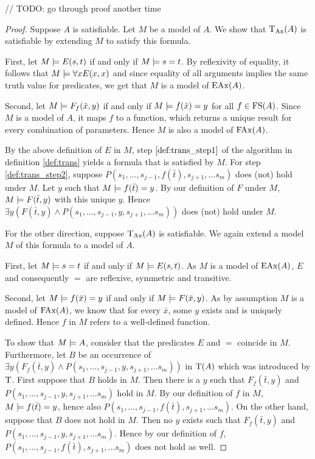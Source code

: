 // TODO: go through proof another time
\begin{proof}
	Suppose $A$ is satisfiable.
	Let $M$ be a model of $A$.
	We show that $\mathrm{T}_{\mathrm{Ax}}(A)$ is satisfiable by extending $M$ to satisfy this formula.

	First, let $M \models E(s, t)$ if and only if $M \models s = t$.
	By reflexivity of equality, it follows that $M \models \forall x E(x, x)$ and since equality of all arguments implies the same truth value for predicates, we get that $M$ is a model of $\mathrm{EAx}(A)$.

	Second, let $M \models F_f(\bar x, y)$ if and only if $M \models f(\bar x) = y$ for all $f \in \mathrm{FS}(A)$. 
	Since $M$ is a model of $A$, it maps $f$ to a function, which returns a unique result for every combination of parameters.
	Hence $M$ is also a model of $\mathrm{FAx}(A)$.

	By the above definition of $E$ in $M$, step $\ref{def:trans_step1}$ of the algorithm in definition \ref{def:trans} yields a formula that is satisfied by $M$.
	For step \ref{def:trans_step2}, suppose $P(s_1, \ldots, s_{j-1}, f(\bar t),\allowbreak s_{j+1}, \ldots s_m)$ does (not) hold under $M$.
	Let $y$ such that $M \models f(\bar t)=y$.
	By our definition of $F$ under $M$, $M\models F(\bar t, y)$ with this unique $y$.
	Hence $\exists y (F(\bar t, y) \land P(s_1, \ldots, s_{j-1}, y, \allowbreak s_{j+1}, \ldots s_m))$ does (not) hold under $M$.


	For the other direction, suppose $\mathrm{T}_{\mathrm{Ax}}(A)$ is satisfiable. We again extend a model $M$ of this formula to a model of $A$.

	First, let $M\models s = t$ if and only if $M\models E(s, t)$. As $M$ is a model of $\mathrm{EAx}(A)$, $E$ and consequently $=$ are reflexive, symmetric and transitive.

	Second, let $M\models f(\bar x) = y$ if and only if $M\models F(\bar x, y)$.
	As by assumption $M$ is a model of $\mathrm{FAx}(A)$, we know that for every $\bar x$, some $y$ exists and is uniquely defined.
	Hence $f$ in $M$ refers to a well-defined function.

	To show that $M \models A$, consider that the predicates $E$ and $=$ coincide in $M$.
	Furthermore, let $B$ be an occurrence of $\exists y (F_f(\bar t, y) \land P(s_1, \ldots, s_{j-1}, y, s_{j+1}, \ldots s_m))$ in $\mathrm{T}(A)$ which was introduced by $\mathrm{T}$.
	First suppose that $B$ holds in $M$.
	Then there is a $y$ such that $F_f(\bar t, y)$ and $P(s_1, \ldots, s_{j-1}, y, s_{j+1}, \ldots s_m)$ hold in $M$. 
	By our definition of $f$ in $M$, $M \models f(\bar t) = y$, hence also
	$P(s_1, \ldots, s_{j-1}, f(\bar t), s_{j+1}, \ldots s_m)$.
	On the other hand, suppose that $B$ does not hold in $M$.
	Then no $y$ exists such that $F_f(\bar t, y)$ and $P(s_1, \ldots, s_{j-1}, y, s_{j+1}, \ldots s_m)$. 
	Hence by our definition of $f$, $P(s_1, \ldots, s_{j-1}, f(\bar t), s_{j+1}, \ldots s_m)$ does not hold as well.
\end{proof}

